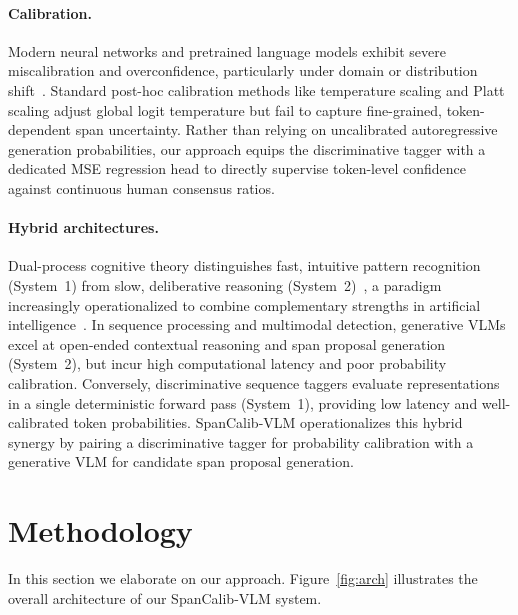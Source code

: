 \documentclass[11pt]{article}
\begin{document}
\paragraph{Calibration.}
Modern neural networks and pretrained language models exhibit severe miscalibration and overconfidence, particularly under domain or distribution shift~\cite{guo2017calibration,ovadia2019can,desai2020calibration,kadavath2022language}. Standard post-hoc calibration methods like temperature scaling and Platt scaling adjust global logit temperature but fail to capture fine-grained, token-dependent span uncertainty. Rather than relying on uncalibrated autoregressive generation probabilities, our approach equips the discriminative tagger with a dedicated MSE regression head to directly supervise token-level confidence against continuous human consensus ratios.

\paragraph{Hybrid architectures.}
Dual-process cognitive theory distinguishes fast, intuitive pattern recognition (System~1) from slow, deliberative reasoning (System~2)~\cite{kahneman2011thinking}, a paradigm increasingly operationalized to combine complementary strengths in artificial intelligence~\cite{booch2021thinking,ahn2024system}. In sequence processing and multimodal detection, generative VLMs excel at open-ended contextual reasoning and span proposal generation (System~2), but incur high computational latency and poor probability calibration. Conversely, discriminative sequence taggers evaluate representations in a single deterministic forward pass (System~1), providing low latency and well-calibrated token probabilities. SpanCalib-VLM operationalizes this hybrid synergy by pairing a discriminative tagger for probability calibration with a generative VLM for candidate span proposal generation.

\section{Methodology}

In this section we elaborate on our approach. Figure~\ref{fig:arch} illustrates the overall architecture of our SpanCalib-VLM system.
\end{document}
